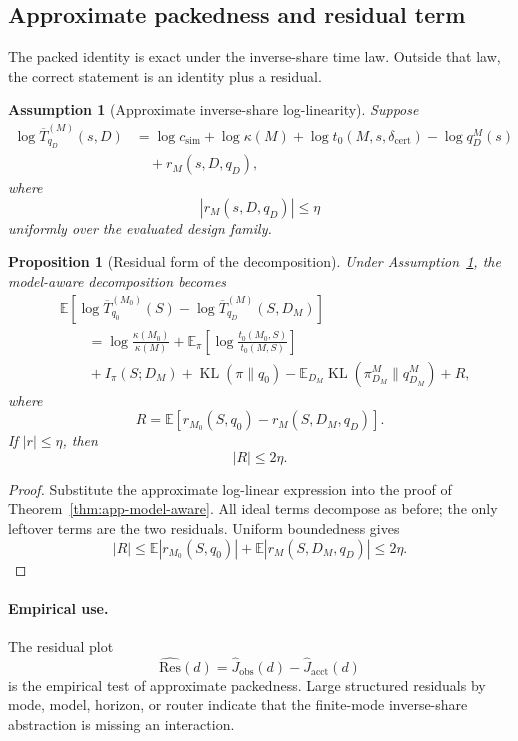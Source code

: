 \documentclass{article}
\newtheorem{assumption}{Assumption}
\newtheorem{proposition}{Proposition}
\DeclareMathOperator{\KL}{KL}
\newcommand{\E}{\mathbb{E}}
\begin{document}
\subsection{Approximate packedness and residual term}

The packed identity is exact under the inverse-share time law.
Outside that law, the correct statement is an identity plus a residual.

\begin{assumption}[Approximate inverse-share log-linearity]
\label{ass:app-approx-log-linear}
Suppose
\[
\begin{aligned}
    \log \overline T^{(M)}_{q_D}(s,D)
    &=
    \log c_{\mathrm{sim}}
    +
    \log\kappa(M)
    +
    \log t_0(M,s,\delta_{\mathrm{cert}})
    -
    \log q_D^M(s)
    \\
    &\quad
    +
    r_M(s,D,q_D),
\end{aligned}
\]
where
\[
    |r_M(s,D,q_D)|\le \eta
\]
uniformly over the evaluated design family.
\end{assumption}

\begin{proposition}[Residual form of the decomposition]
\label{prop:app-residual-decomp}
Under Assumption~\ref{ass:app-approx-log-linear}, the model-aware decomposition becomes
\[
\begin{aligned}
&\E[
    \log \overline T^{(M_0)}_{q_0}(S)
    -
    \log \overline T^{(M)}_{q_D}(S,D_M)
]
\\
&\qquad =
\log\frac{\kappa(M_0)}{\kappa(M)}
+
\E_\pi
\left[
    \log\frac{t_0(M_0,S)}{t_0(M,S)}
\right]
\\
&\qquad
+
I_\pi(S;D_M)
+
\KL(\pi\|q_0)
-
\E_{D_M}\KL(\pi_{D_M}^M\|q_{D_M}^M)
+
R,
\end{aligned}
\]
where
\[
    R
    =
    \E[r_{M_0}(S,q_0)-r_M(S,D_M,q_D)].
\]
If \(|r|\le\eta\), then
\[
    |R|\le 2\eta.
\]
\end{proposition}

\begin{proof}
Substitute the approximate log-linear expression into the proof of
Theorem~\ref{thm:app-model-aware}.  All ideal terms decompose as before; the only leftover
terms are the two residuals.  Uniform boundedness gives
\[
    |R|
    \le
    \E|r_{M_0}(S,q_0)|+\E|r_M(S,D_M,q_D)|
    \le 2\eta.
\]
\end{proof}

\paragraph{Empirical use.}
The residual plot
\[
    \widehat{\mathrm{Res}}(d)
    =
    \widehat J_{\mathrm{obs}}(d)-\widehat J_{\mathrm{acct}}(d)
\]
is the empirical test of approximate packedness.
Large structured residuals by mode, model, horizon, or router indicate that the finite-mode
inverse-share abstraction is missing an interaction.
\end{document}
